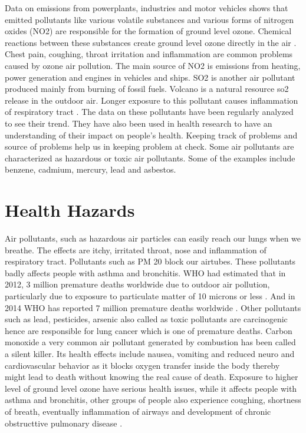 \documentclass[sigconf]{acmart}
\begin{document}
Data on emissions from powerplants, industries and motor vehicles shows that emitted pollutants like various volatile substances and various forms of nitrogen oxides (NO2) are responsible for the formation of ground level ozone. Chemical reactions between these substances create ground level ozone directly in the air \cite{epa-gov}. Chest pain, coughing, throat irritation and inflammation are common problems caused by ozone air pollution. The main source of NO2 is emissions from heating, power generation and engines in vehicles and ships. SO2 is another air pollutant produced mainly from burning of fossil fuels. Volcano is a natural resource so2 release  in the outdoor air. Longer exposure to this pollutant causes inflammation of respiratory tract \cite{www-who}. The data on these pollutants have been regularly analyzed to see their trend. They have also been used in health research to have an understanding of their impact on people's health. Keeping track of problems and source of problems help us in keeping problem at check. Some air pollutants are characterized as hazardous or toxic air pollutants. Some of the examples include benzene, cadmium, mercury, lead and asbestos. 

\section{Health Hazards}
Air pollutants, such as  hazardous air particles can easily reach our lungs when we breathe. The effects are itchy, irritated throat, nose and inflammation of respiratory tract. Pollutants such as PM 20 block our airtubes. These pollutants badly affects people with asthma and bronchitis. WHO had estimated that in 2012, 3 million premature deaths worldwide due to outdoor air pollution, particularly due to exposure to particulate matter of 10 microns or less \cite{www-who}. And in 2014 WHO has reported 7 million premature deaths worldwide \cite{www-who}. Other pollutants such as lead, pesticides, arsenic also called as toxic pollutants are carcinogenic hence are responsible for lung cancer which is one of premature deaths. Carbon monoxide a very common air pollutant generated by combustion has been called a silent killer. Its health effects include nausea, vomiting and reduced neuro and cardiovascular behavior as it blocks oxygen transfer inside the body thereby might lead to death without knowing the real cause of death. Exposure to higher level of ground level ozone have serious health issues, while it affects people with asthma and bronchitis, other groups of people also experience coughing, shortness of breath, eventually inflammation of airways and development of chronic obstructtive pulmonary disease \cite{ozone}.
\end{document}
